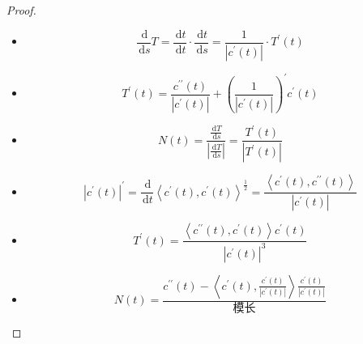 \documentclass[../../古典微分几何.tex]{subfiles}
\begin{document}
\begin{proof}
    \begin{itemize}
        \item  \[
            \frac{\,\mathrm{d}  }{\,\mathrm{d} s }T =  \frac{\,\mathrm{d} t }{\,\mathrm{d} t }\cdot \frac{\,\mathrm{d} t }{\,\mathrm{d} s }=  \frac{1}{\left| c^{\prime} \left( t \right)  \right| }\cdot T^{\prime} \left( t \right)    
            \]  
        \item \[
            T^{\prime} \left( t \right)=  \frac{c ^{\prime \prime} \left( t \right)  }{\left| c^{\prime} \left( t \right)  \right|  } +  \left( \frac{1}{\left| c^{\prime} \left( t \right)  \right| } \right)^{\prime}  c^{\prime} \left( t \right)      
        \]
        
        \item \[
        N\left( t \right) =  \frac{ \frac{\,\mathrm{d} T }{\,\mathrm{d} s }  }{\left| \frac{\,\mathrm{d} T }{\,\mathrm{d} s }  \right|  }   =  \frac{T^{\prime} \left( t \right)  }{\left| T^{\prime} \left( t \right)  \right|  } 
        \]
        \item \[
        \left| c^{\prime} \left( t \right)  \right|^{\prime}  =  \frac{\,\mathrm{d}  }{\,\mathrm{d} t } \left<c^{\prime} \left( t \right),c^{\prime} \left( t \right)   \right>^{\frac{1}{2}}   =  \frac{\left<c^{\prime} \left( t \right),c ^{\prime \prime} \left( t \right)   \right>}{\left| c^{\prime} \left( t \right)  \right| }
        \]

        \item \[
        T^{\prime} \left( t \right)=    \frac{ \left<c ^{\prime \prime} \left( t \right),c^{\prime} \left( t \right)   \right>c^{\prime} \left( t \right)  }{ \left| c^{\prime} \left( t \right)  \right|^{3} }   
        \]
        
        \item \[
        N\left( t \right)=  \frac{c ^{\prime \prime} \left( t \right)- \left<c^{\prime} \left( t \right), \frac{c^{\prime} \left( t \right)  }{\left| c^{\prime} \left( t \right)  \right|  }   \right>  \frac{c^{\prime} \left( t \right)  }{\left| c^{\prime} \left( t \right)  \right|  }  }{ \text{模长}}  
        \]
        

\end{itemize}
\end{proof}
\end{document}
